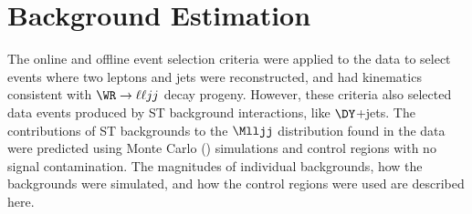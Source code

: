 \chapter{Background Estimation}
\label{sec:backgroundEstimation}
The online and offline event selection criteria were applied to the data to select events where two leptons and jets were 
reconstructed, and had kinematics consistent with $\WR \rightarrow \ell\ell jj$ decay progeny.  However, these criteria also 
selected data events produced by ST background interactions, like $\DY$+jets.  
The contributions of ST backgrounds to the $\Mlljj$ distribution found in the data were predicted using Monte Carlo (\MC) 
simulations and control regions with no \WR signal contamination.  The magnitudes of individual backgrounds, how the 
backgrounds were simulated, and how the control regions were used are described here.


